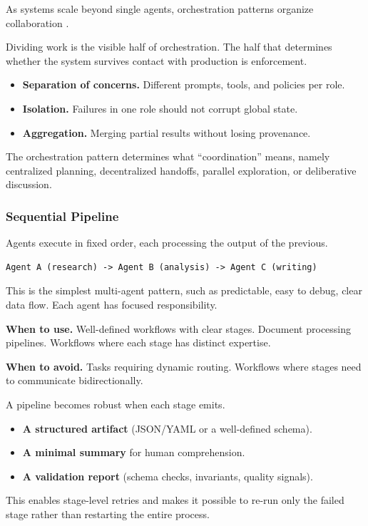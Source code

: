 As systems scale beyond single agents, orchestration patterns organize collaboration \cite{msagentpatterns2025}.

Dividing work is the visible half of orchestration. The half that determines
whether the system survives contact with production is enforcement.
\begin{itemize}
\item \textbf{Separation of concerns.} Different prompts, tools, and policies per role.
\item \textbf{Isolation.} Failures in one role should not corrupt global state.
\item \textbf{Aggregation.} Merging partial results without losing provenance.
\end{itemize}
The orchestration pattern determines what ``coordination'' means, namely centralized planning, decentralized handoffs, parallel exploration, or deliberative discussion.

\subsubsection{Sequential Pipeline}

Agents execute in fixed order, each processing the output of the previous.

{\footnotesize
\begin{verbatim}
Agent A (research) -> Agent B (analysis) -> Agent C (writing)
\end{verbatim}
}

This is the simplest multi-agent pattern, such as predictable, easy to debug, clear data flow. Each agent has focused responsibility.

\textbf{When to use.} Well-defined workflows with clear stages. Document processing pipelines. Workflows where each stage has distinct expertise.

\textbf{When to avoid.} Tasks requiring dynamic routing. Workflows where stages need to communicate bidirectionally.

A pipeline becomes robust when each stage emits.
\begin{itemize}
\item \textbf{A structured artifact} (JSON/YAML or a well-defined schema).
\item \textbf{A minimal summary} for human comprehension.
\item \textbf{A validation report} (schema checks, invariants, quality signals).
\end{itemize}
This enables stage-level retries and makes it possible to re-run only the failed stage rather than restarting the entire process.


